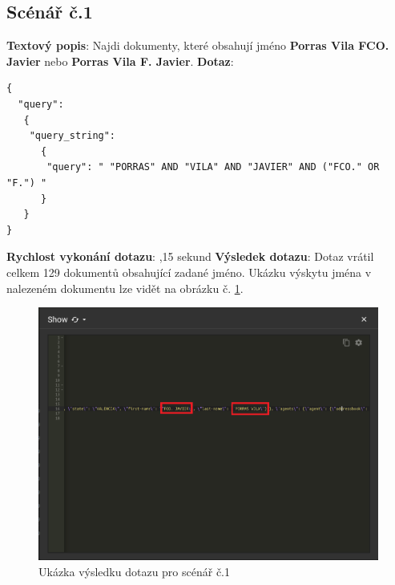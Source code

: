 \subsection{Scénář č.1}
\textbf{Textový popis}: Najdi dokumenty, které obsahují jméno \textbf{Porras Vila FCO. Javier} nebo \textbf{Porras Vila F. Javier}.
\newline
\textbf{Dotaz}: 
\begin{lstlisting}[label = {lst:elements_a}]
{
  "query": 
   {
    "query_string": 
      {
       "query": " "PORRAS" AND "VILA" AND "JAVIER" AND ("FCO." OR "F.") "
      }
   }
}
\end{lstlisting}
\textbf{Rychlost vykonání dotazu}: ,15 sekund
\newline
\textbf{Výsledek dotazu}: Dotaz vrátil celkem 129 dokumentů obsahující zadané jméno. Ukázku výskytu jména v nalezeném dokumentu lze vidět na obrázku č. \ref{fig:scenar_1_mongo}.
\begin{figure}[H]
\centering
\includegraphics[width=14cm]{img/scenare/scenar_1_mongo}
\caption{Ukázka výsledku dotazu pro scénář č.1}
\label{fig:scenar_1_mongo}
\end{figure}

\newpage
